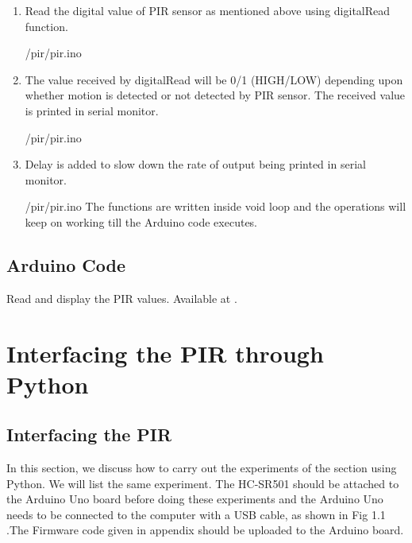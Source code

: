 \begin{enumerate}
  \item Read the digital value of PIR sensor as mentioned above using digitalRead function.
        
        {\LocPIRardcode/pir/pir.ino}
\item The value received by digitalRead will be 0/1 (HIGH/LOW) depending upon whether motion is detected or not detected by PIR sensor. The received value is printed in serial monitor.
        
        {\LocPIRardcode/pir/pir.ino}
\item Delay is added to slow down the rate of output being printed in serial monitor.
        
        {\LocPIRardcode/pir/pir.ino}
The functions are written inside void loop and the operations will keep on working till the Arduino code executes.    

\end{enumerate}


\subsection{Arduino Code}
\label{sec:ldr-arduino-code}

\begin{ardcode}
  {Read and display the PIR values.  Available at
    .}
  \label{ard:ldr-read}
  
\end{ardcode}





\section{Interfacing the PIR through Python}
\subsection{Interfacing the PIR}
In this section, we discuss how to carry out the experiments of the section  using Python. We will list the same experiment. The HC-SR501 should be attached to the Arduino Uno board before doing these experiments and the Arduino Uno needs to be connected to the computer with a USB cable, as shown in Fig 1.1 .The Firmware code given in appendix should be uploaded to the Arduino board. 

